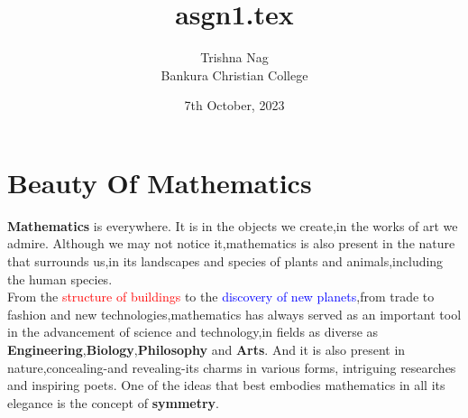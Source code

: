 \documentclass[12pt]{article}
\title{asgn1.tex}
\author{Trishna Nag\\Bankura Christian College }
\date{7th October, 2023}
\begin{document}
\maketitle

\section{Beauty Of Mathematics}
\textbf{Mathematics} is everywhere. It is in the objects we create,in the works of art we admire. Although we may not notice it,mathematics is also present in the nature that surrounds us,in its landscapes and species of plants and animals,including the human species.\\From the \textcolor{red}{structure of buildings} to the \textcolor{blue}{ discovery of new planets},from trade to fashion and new technologies,mathematics has always served as an important tool in the advancement of science and technology,in fields as diverse as \textbf{Engineering},\textbf{Biology},\textbf{Philosophy} and \textbf{Arts}. And it is also present in nature,concealing-and revealing-its charms in various forms, intriguing researches and inspiring poets. One of the ideas that best embodies mathematics in all its elegance is the concept of \textbf{symmetry}.
\end{document}

